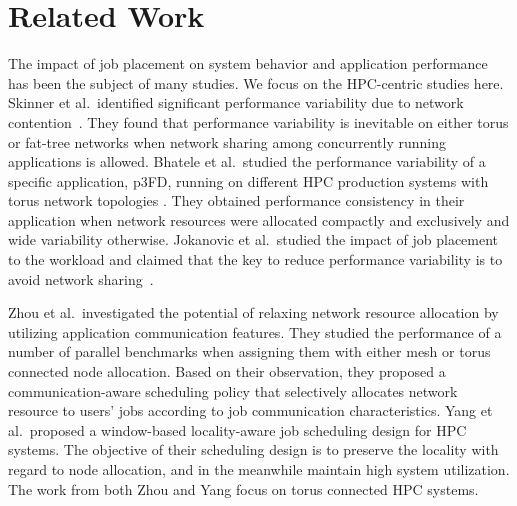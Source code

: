 \section{Related Work}
\label{sec:related work}

The impact of job placement on system behavior and application performance has been the subject of many studies.
We focus on the HPC-centric studies here. Skinner et al.\ identified significant performance variability due to network contention~\cite{dskinner}. They found that performance variability is inevitable on either torus or fat-tree networks when network sharing among concurrently running applications is allowed.
Bhatele et al.\ studied the performance variability of a specific application, p3FD, running on different HPC production systems with torus network topologies \cite{abhinav-sc13}. They obtained performance consistency in their application when network resources were allocated compactly and exclusively and wide variability otherwise. Jokanovic et al.\ studied the impact of job placement to the workload and claimed that the key to reduce performance variability is to avoid network sharing~\cite{jose-ipdps15}. 

Zhou et al.\ investigated the potential of relaxing network resource allocation by utilizing application communication features\cite{zhou-ipdps-2015}. They studied the performance of a number of parallel benchmarks when assigning them with either mesh or torus connected node allocation. Based on their observation, they proposed a communication-aware scheduling policy that selectively allocates network resource to users’ jobs according to job communication characteristics. Yang et al.\ proposed a window-based locality-aware job scheduling design for HPC systems\cite{Yang-Cluster14}. The objective of their scheduling design is to preserve the locality with regard to node allocation, and in the meanwhile maintain high system utilization. The work from both Zhou and Yang focus on torus connected HPC systems. 

